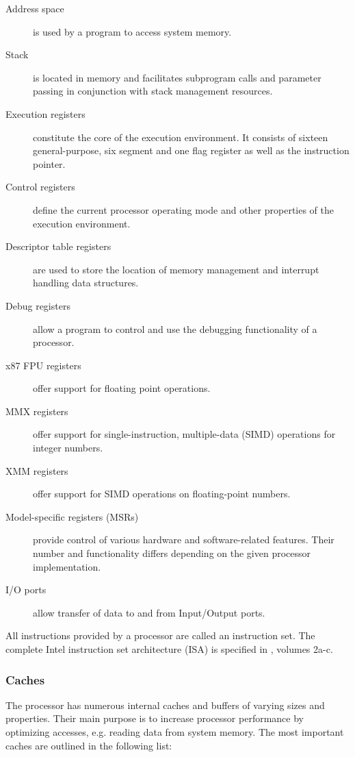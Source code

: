 \begin{description}
	\item[Address space] is used by a program to access system memory.
	\item[Stack] is located in memory and facilitates subprogram calls and
		parameter passing in conjunction with stack management resources.
	\item[Execution registers] constitute the core of the execution environment.
		It consists of sixteen general-purpose, six segment and one flag
		register as well as the instruction pointer.
	\item[Control registers] define the current processor operating mode and
		other properties of the execution environment.
	\item[Descriptor table registers] are used to store the location of memory
		management and interrupt handling data structures.
	\item[Debug registers] allow a program to control and use the debugging
		functionality of a processor.
	\item[x87 FPU registers] offer support for floating point operations.
	\item[MMX registers] offer support for single-instruction, multiple-data
		(SIMD) operations for integer numbers.
	\item[XMM registers] offer support for SIMD operations on floating-point
		numbers.
	\item[Model-specific registers (MSRs)] provide control of various hardware
		and software-related features. Their number and functionality differs
		depending on the given processor implementation.
	\item[I/O ports] allow transfer of data to and from Input/Output ports.
\end{description}

All instructions provided by a processor are called an instruction set. The
complete Intel instruction set architecture (ISA) is specified in
\cite{IntelSDM}, volumes 2a-c.

\subsubsection{Caches}
The processor has numerous internal caches and buffers of varying sizes and
properties. Their main purpose is to increase processor performance by
optimizing accesses, e.g. reading data from system memory. The most important
caches are outlined in the following list:

